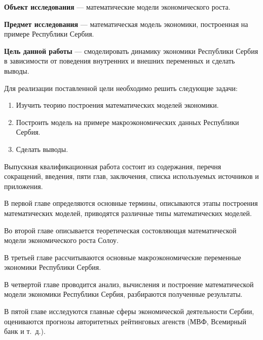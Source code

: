 \textbf{Объект исследования} --- математические модели экономического роста.

\textbf{Предмет исследования} --- математическая модель экономики, построенная на примере Республики Сербия.

\textbf{Цель данной работы} --- смоделировать динамику экономики Республики Сербия в зависимости от поведения внутренних и внешних переменных и сделать выводы.

Для реализации поставленной цели необходимо решить следующие задачи:
\begin{enumerate}
	\item Изучить теорию построения математических моделей экономики.
	\item Построить модель на примере макроэкономических данных Республики Сербия.
	\item Сделать выводы.
\end{enumerate}

Выпускная квалификационная работа состоит из содержания, перечня сокращений, введения, пяти глав, заключения, списка используемых источников и приложения.

В первой главе определяются основные термины, описываются этапы построения математических моделей, приводятся различные типы математических моделей.

Во второй главе описывается теоретическая состовляющая математической модели экономического роста Солоу.

В третьей главе рассчитываются основные макроэкономические переменные экономики Республики Сербия.

В четвертой главе проводится анализ, вычисления и построение математической модели экономики Республики Сербия, разбираются полученные результаты.

В пятой главе исследуются главные сферы экономической деятельности Сербии, оцениваются прогнозы авторитетных рейтинговых агенств (МВФ, Всемирный банк и т.~д.).
